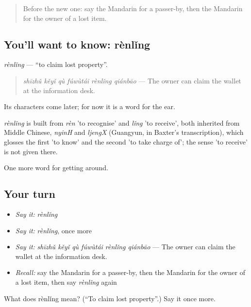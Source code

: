 \label{lesson:ZH-C456-renling}



\begin{quote}
Before the new one: say the Mandarin for a passer-by, then the Mandarin for the owner of a lost item.
\end{quote}

\subsection*{You'll want to know: rènlǐng}
\emph{rènlǐng} — \textquotedblleft{}to claim lost property\textquotedblright{}.

\begin{quote}
\emph{shīzhǔ kěyǐ qù fúwùtái rènlǐng qiánbāo} — The owner can claim the wallet at the information desk.
\end{quote}

Its characters come later; for now it is a word for the ear.

\begin{cousinweb}
\emph{rènlǐng} is built from \emph{rèn} 'to recognise' and \emph{lǐng} 'to receive', both inherited from Middle Chinese, \emph{nyinH} and \emph{ljengX} (Guangyun, in Baxter's transcription), which glosses the first 'to know' and the second 'to take charge of'; the sense 'to receive' is not given there.
\end{cousinweb}

\begin{grammarlens}[title={What you've built}]
One more word for getting around.
\end{grammarlens}

\subsection*{Your turn}
\begin{itemize}
\raggedright
  \item \emph{Say it:} \emph{rènlǐng}
  \item \emph{Say it:} \emph{rènlǐng}, once more
  \item \emph{Say it:} \emph{shīzhǔ kěyǐ qù fúwùtái rènlǐng qiánbāo} — The owner can claim the wallet at the information desk.
  \item \emph{Recall:} say the Mandarin for a passer-by, then the Mandarin for the owner of a lost item, then say \emph{rènlǐng} again
\end{itemize}

\begin{tcolorbox}[breakable,colback=teal!4,colframe=teal!35!black,title={Before you move on}]
What does rènlǐng mean? (\textquotedblleft{}To claim lost property\textquotedblright{}.) Say it once more.
\end{tcolorbox}

